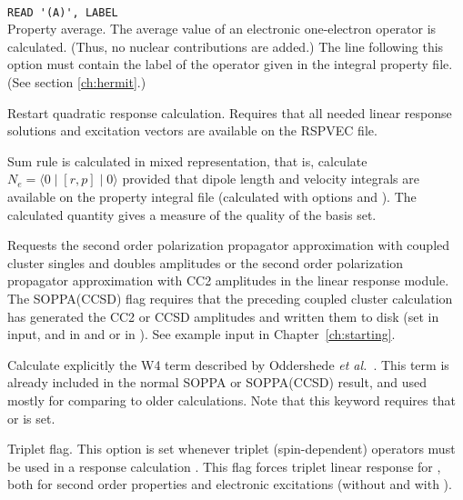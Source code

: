 \begin{description}
\item{} \\
\verb|READ '(A)', LABEL|\\
Property average.
The average value of an electronic one-electron
operator is calculated.
(Thus, no nuclear contributions are added.)
The line following this option must contain the
label of the operator given in the integral property file.
(See section \ref{ch:hermit}.)

\item{}
Restart quadratic response
calculation.
Requires that all needed linear response solutions and excitation vectors
are available on the RSPVEC file.

\item{}
Sum rule is calculated in mixed representation, that is, calculate
$N_e=\langle0\mid [r,p] \mid0\rangle$ provided that dipole length and
velocity integrals are available on the property integral file
(calculated with  options  and ).
The calculated quantity gives a measure of the quality of the basis
set.

\item{}
Requests the second order polarization propagator approximation with
coupled cluster singles and doubles amplitudes or the second order
polarization propagator approximation with CC2 amplitudes in the linear
response module. The SOPPA(CCSD)
 flag requires that the preceding coupled cluster
calculation has generated the CC2 or CCSD amplitudes and written them
to disk (set  in  input,  and
 in   and 
 or  in ). See example input in
Chapter~\ref{ch:starting}.

\item{}
Calculate explicitly the W4 term described by Oddershede {\it et
al.\/}~\cite{jopjdycpr2}. This term is already included in the normal
SOPPA or
SOPPA(CCSD) result, and used mostly for comparing to older
calculations. Note that this keyword requires that  or
is set.

\item{}
Triplet flag. This option is set whenever triplet
(spin-dependent)
operators must be used in a response calculation
\cite{jodlypjjcp91,ovhapjhjajthjojcp97}.
This flag forces triplet linear response for ,
both for second order properties and electronic excitations
(without and with ).

\end{description}

